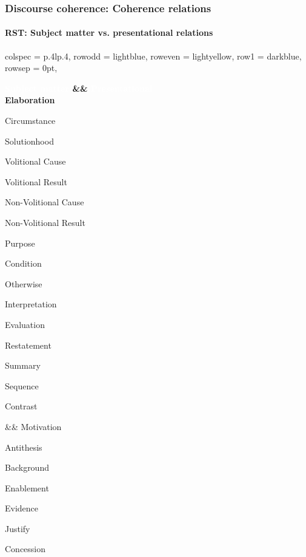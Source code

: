 \documentclass[xcolor=table]{beamer}
\begin{document}
\begin{frame}
	\frametitle{Discourse coherence: Coherence relations}
	\framesubtitle{RST: Subject matter vs. presentational relations}
	
	\begin{center}
		\footnotesize
	\begin{tblr}{
			colspec = {p{.4\textwidth}lp{.4\textwidth}},
			row{odd} = {lightblue},
			row{even} = {lightyellow},
			row{1} = {darkblue},
			rowsep = 0pt,
		}

		\bfseries\textcolor{white}{Subject matter} && \bfseries\textcolor{white}{Presentational}\\
		
		Elaboration
		
		Circumstance
		
		Solutionhood
		
		Volitional Cause
		
		Volitional Result
		
		Non-Volitional Cause
		
		Non-Volitional Result
		
		Purpose
		
		Condition
		
		Otherwise
		
		Interpretation
		
		Evaluation
		
		Restatement
		
		Summary
		
		Sequence
		
		Contrast
		
		&&
		Motivation
		
		Antithesis
		
		Background
		
		Enablement
		
		Evidence
		
		Justify
		
		Concession\\
	\end{tblr}
	\end{center}
	
\end{frame}
\end{document}
